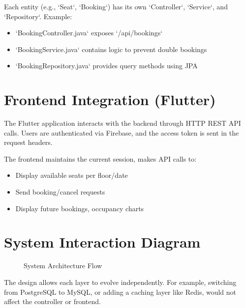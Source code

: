 \documentclass[12pt,a4paper]{report}
\begin{document}
Each entity (e.g., `Seat`, `Booking`) has its own `Controller`, `Service`, and `Repository`. Example:
\begin{itemize}
    \item `BookingController.java` exposes `/api/bookings`
    \item `BookingService.java` contains logic to prevent double bookings
    \item `BookingRepository.java` provides query methods using JPA
\end{itemize}

\section{Frontend Integration (Flutter)}

The Flutter application interacts with the backend through HTTP REST API calls. Users are authenticated via Firebase, and the access token is sent in the request headers.

The frontend maintains the current session, makes API calls to:
\begin{itemize}
    \item Display available seats per floor/date
    \item Send booking/cancel requests
    \item Display future bookings, occupancy charts
\end{itemize}

\section{System Interaction Diagram}

\begin{figure}[H]
    \centering
    \caption{System Architecture Flow}
    \label{fig:architecture}
\end{figure}

The design allows each layer to evolve independently. For example, switching from PostgreSQL to MySQL, or adding a caching layer like Redis, would not affect the controller or frontend.

\newpage



\end{document}
